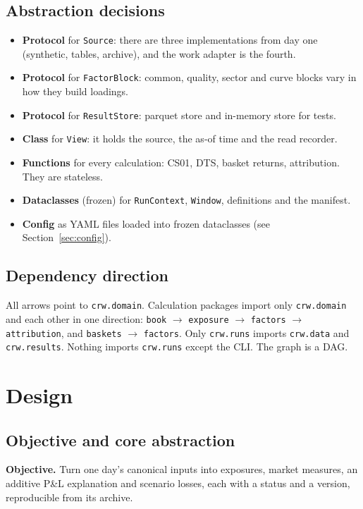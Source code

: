 \documentclass[11pt,a4paper]{article}
\newcommand{\code}[1]{\texttt{\small #1}}
\begin{document}
\subsection{Abstraction decisions}
\begin{itemize}
\item \textbf{Protocol} for \code{Source}: there are three implementations from day one (synthetic, tables, archive), and the work adapter is the fourth.
\item \textbf{Protocol} for \code{FactorBlock}: common, quality, sector and curve blocks vary in how they build loadings.
\item \textbf{Protocol} for \code{ResultStore}: parquet store and in-memory store for tests.
\item \textbf{Class} for \code{View}: it holds the source, the as-of time and the read recorder.
\item \textbf{Functions} for every calculation: CS01, DTS, basket returns, attribution. They are stateless.
\item \textbf{Dataclasses} (frozen) for \code{RunContext}, \code{Window}, definitions and the manifest.
\item \textbf{Config} as YAML files loaded into frozen dataclasses (see Section~\ref{sec:config}).
\end{itemize}

\subsection{Dependency direction}
All arrows point to \code{crw.domain}. Calculation packages import only \code{crw.domain} and each other in one direction: \code{book} $\to$ \code{exposure} $\to$ \code{factors} $\to$ \code{attribution}, and \code{baskets} $\to$ \code{factors}. Only \code{crw.runs} imports \code{crw.data} and \code{crw.results}. Nothing imports \code{crw.runs} except the CLI. The graph is a DAG.

\section{Design}

\subsection{Objective and core abstraction}
\textbf{Objective.} Turn one day's canonical inputs into exposures, market measures, an additive P\&L explanation and scenario losses, each with a status and a version, reproducible from its archive.
\end{document}
